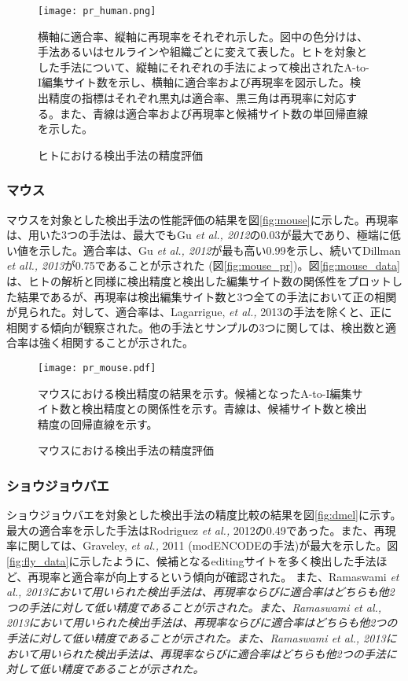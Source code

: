\begin{figure}[!h]
	\begin{center}
		\texttt{[image: pr\_human.png]}
	\end{center}
	\caption{ヒトにおける検出手法の精度評価}
	\begin{flushleft}
		\small{横軸に適合率、縦軸に再現率をそれぞれ示した。図中の色分けは、手法あるいはセルラインや組織ごとに変えて表した。ヒトを対象とした手法について、縦軸にそれぞれの手法によって検出されたA-to-I編集サイト数を示し、横軸に適合率および再現率を図示した。検出精度の指標はそれぞれ黒丸は適合率、黒三角は再現率に対応する。また、青線は適合率および再現率と候補サイト数の単回帰直線を示した。}
	\end{flushleft}
\end{figure}

\subsubsection{マウス}
マウスを対象とした検出手法の性能評価の結果を図\ref{fig:mouse}に示した。再現率は、用いた3つの手法は、最大でもGu \textit{et al., 2012}の0.03が最大であり、極端に低い値を示した。適合率は、Gu \textit{et al., 2012}が最も高い0.99を示し、続いてDillman \textit{et all., 2013}が0.75であることが示された (図\ref{fig:mouse_pr})。図\ref{fig:mouse_data}は、ヒトの解析と同様に検出精度と検出した編集サイト数の関係性をプロットした結果であるが、再現率は検出編集サイト数と3つ全ての手法において正の相関が見られた。対して、適合率は、Lagarrigue, \textit{et al., }2013の手法を除くと、正に相関する傾向が観察された。他の手法とサンプルの3つに関しては、検出数と適合率は強く相関することが示された。
\begin{figure}[!h]
	\begin{center}
		\texttt{[image: pr\_mouse.pdf]}
	\end{center}
	\caption{マウスにおける検出手法の精度評価}
	\begin{flushleft}
		\small{マウスにおける検出精度の結果を示す。候補となったA-to-I編集サイト数と検出精度との関係性を示す。青線は、候補サイト数と検出精度の回帰直線を示す。}
	\end{flushleft}
\end{figure}

\subsubsection{ショウジョウバエ}
ショウジョウバエを対象とした検出手法の精度比較の結果を図\ref{fig:dmel}に示す。最大の適合率を示した手法はRodriguez \textit{et al., }2012の0.49であった。また、再現率に関しては、Graveley, \textit{et al., }2011 (modENCODEの手法)が最大を示した。図\ref{fig:fly_data}に示したように、候補となるeditingサイトを多く検出した手法ほど、再現率と適合率が向上するという傾向が確認された。
また、Ramaswami \it{et al}\rm{}., 2013において用いられた検出手法は、再現率ならびに適合率はどちらも他2つの手法に対して低い精度であることが示された。また、Ramaswami \it{et al}\rm{}., 2013において用いられた検出手法は、再現率ならびに適合率はどちらも他2つの手法に対して低い精度であることが示された。また、Ramaswami \it{et al}\rm{}., 2013において用いられた検出手法は、再現率ならびに適合率はどちらも他2つの手法に対して低い精度であることが示された。

